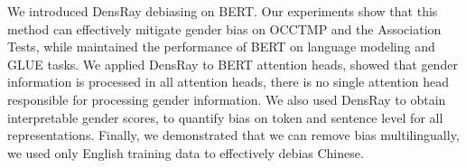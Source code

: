 We introduced DensRay debiasing on BERT. Our experiments
show that this method can effectively mitigate gender bias on OCCTMP and the Association Tests, while maintained the performance of BERT on language modeling and GLUE tasks. We applied DensRay to BERT attention heads, showed that gender information is processed in all attention heads, there is no single attention head responsible for processing gender information. We also used DensRay to obtain interpretable gender scores, to quantify bias on token and sentence level for all representations. Finally, we demonstrated that we can remove bias multilingually, we used only English training data to effectively debias Chinese. 


